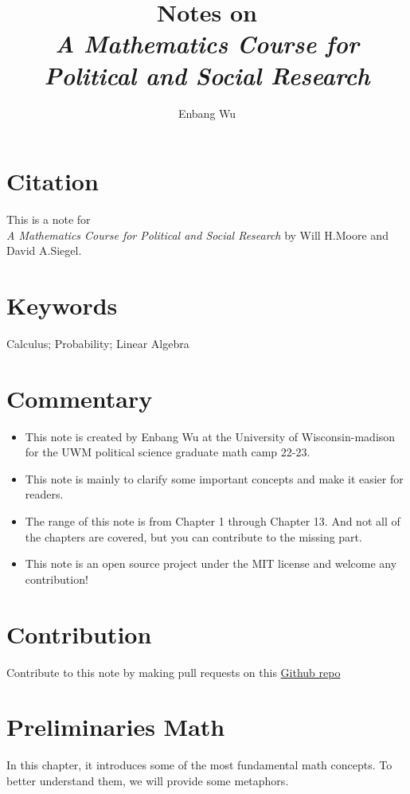 \documentclass{article}
\title{Notes on \\ \textit{A Mathematics Course for Political and Social Research}}
\author{Enbang Wu}
\begin{document}
\maketitle

\section{Citation}
This is a note for \\ \textit{A Mathematics Course for Political and Social Research} by Will H.Moore and David A.Siegel.

\section{Keywords}
Calculus; Probability; Linear Algebra


\section{Commentary}
\begin{itemize}
    \item This note is created by Enbang Wu at the University of Wisconsin-madison for the UWM political science graduate math camp 22-23.
    \item This note is mainly to clarify some important concepts and make it easier for readers.
    \item The range of this note is from Chapter 1 through Chapter 13. And not all of the chapters are covered, but you can contribute to the missing part.
    \item This note is an open source project under the MIT license and welcome any contribution!
\end{itemize}

\section{Contribution}
Contribute to this note by making pull requests on this \hyperlink{https://github.com/EnbangWu/Notes-on-Math4PS}{Github repo}

\newpage
\tableofcontents
\newpage

\section{Preliminaries Math}
In this chapter, it introduces some of the most fundamental math concepts. To better understand them, we will provide some metaphors.
\end{document}
